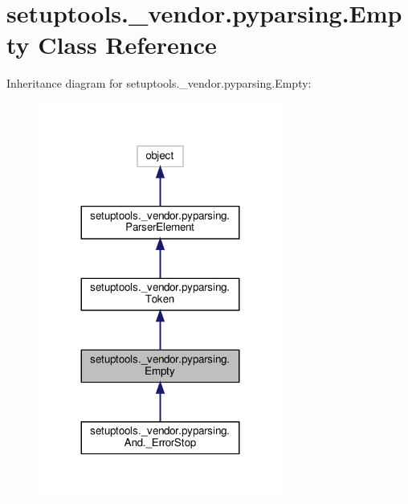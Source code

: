 \hypertarget{classsetuptools_1_1__vendor_1_1pyparsing_1_1Empty}{}\section{setuptools.\+\_\+vendor.\+pyparsing.\+Empty Class Reference}
\label{classsetuptools_1_1__vendor_1_1pyparsing_1_1Empty}


Inheritance diagram for setuptools.\+\_\+vendor.\+pyparsing.\+Empty\+:
\nopagebreak
\begin{figure}[H]
\begin{center}
\leavevmode
\includegraphics[width=227pt]{classsetuptools_1_1__vendor_1_1pyparsing_1_1Empty__inherit__graph}
\end{center}
\end{figure}


